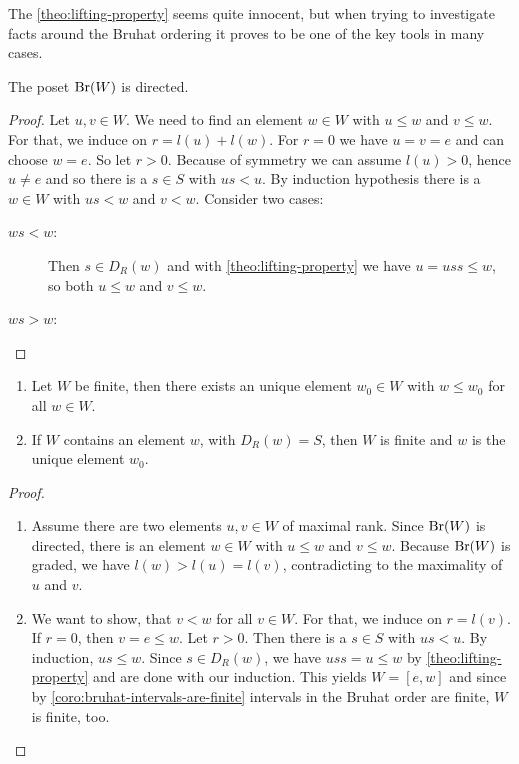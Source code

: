 The \ref{theo:lifting-property} seems quite innocent, but when trying to investigate facts around the Bruhat ordering it proves to be one of the key tools in many cases.

\begin{prop}
	The poset $\operatorname{Br}(W)$ is directed.

	\begin{proof}
		Let $u,v \in W$. We need to find an element $w \in W$ with $u \leq w$ and $v \leq w$. For that, we induce on $r = l(u) + l(w)$. For $r = 0$ we have $u = v = e$ and can choose $w = e$. So let $r > 0$. Because of symmetry we can assume $l(u) > 0$, hence $u \neq e$ and so there is a $s \in S$ with $us < u$. By induction hypothesis there is a $w \in W$ with $us < w$ and  $v < w$. Consider two cases:

		\begin{description}
			\item[$ws < w$:] Then $s \in D_R(w)$ and with \ref{theo:lifting-property} we have $u = uss \leq w$, so both $u \leq w$ and $v \leq w$.
			\item[$ws > w$:] \todo \qedhere
		\end{description}
	\end{proof}
\end{prop}

\begin{coro}
	\begin{enumerate}
		\item Let $W$ be finite, then there exists an unique element $w_0 \in W$ with $w \leq w_0$ for all $w \in W$.
		\item If $W$ contains an element $w$, with $D_R(w) = S$, then $W$ is finite and $w$ is the unique element $w_0$.
	\end{enumerate}

	\begin{proof}
		\begin{enumerate}
			\item Assume there are two elements $u,v \in W $ of maximal rank. Since $\operatorname{Br}(W)$ is directed, there is an element $w \in W$ with $u \leq w$ and $v \leq w$. Because $\operatorname{Br}(W)$ is graded, we have $l(w) > l(u) = l(v)$, contradicting to the maximality of $u$ and $v$.
			\item We want to show, that $v < w$ for all $v \in W$. For that, we induce on $r = l(v)$. If $r = 0$, then $v = e \leq w$. Let $r > 0$. Then there is a $s \in S$ with $us < u$. By induction, $us \leq w$. Since $s \in D_R(w)$, we have $uss = u \leq w$ by \ref{theo:lifting-property} and are done with our induction. This yields $W = [e,w]$ and since by \ref{coro:bruhat-intervals-are-finite} intervals in the Bruhat order are finite, $W$ is finite, too. \qedhere
		\end{enumerate}
	\end{proof}
\end{coro}

